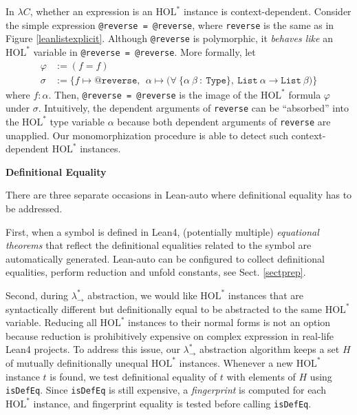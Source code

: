   In $\lambda C$, whether an expression is an $\text{HOL}^*$ instance is context-dependent.
Consider the simple expression \texttt{@reverse = @reverse}, where \texttt{reverse}
is the same as in Figure \ref{leanlistexplicit}. Although \texttt{@reverse} is polymorphic,
it \textit{behaves like} an $\text{HOL}^*$ variable in \texttt{@reverse = @reverse}. More formally,
let
$$\begin{aligned}
\varphi &:= (f = f) \\
\sigma  &:= \{f \mapsto \texttt{@reverse}, \ \ \alpha \mapsto \texttt{(} \forall \ \texttt{\{}\alpha \ \beta \ : \ \texttt{Type\}}, \ 
  \texttt{List} \ \alpha \to \texttt{List} \ \beta \texttt{)}\}
\end{aligned}$$
where $f : \alpha$. Then, \texttt{@reverse = @reverse} is the image of the $\text{HOL}^*$ formula $\varphi$
under $\sigma$. Intuitively, the dependent arguments of \texttt{reverse} can be ``absorbed''
into the $\text{HOL}^*$ type variable $\alpha$ because both dependent arguments of \texttt{reverse} are unapplied.
Our monomorphization procedure is able to detect such context-dependent $\text{HOL}^*$ instances.

\noindent \textbf{Definitional Equality}

  There are three separate occasions in Lean-auto where definitional
equality has to be addressed.

  First, when a symbol is defined in Lean4, (potentially multiple) \textit{equational theorems} that
reflect the definitional equalities related to the symbol are automatically generated.
Lean-auto can be configured to collect definitional equalities, perform reduction and
unfold constants, see Sect. \ref{sectprep}.

  Second, during $\lambda_\to^*$ abstraction, we would like $\text{HOL}^*$ instances
that are syntactically different but definitionally equal to be abstracted to the
same $\text{HOL}^*$ variable. Reducing all $\text{HOL}^*$ instances to their normal forms is
not an option because reduction is prohibitively expensive on complex
expression in real-life Lean4 projects. To address this issue, our $\lambda_\to^*$ abstraction algorithm keeps a
set $H$ of mutually definitionally unequal $\text{HOL}^*$ instances. Whenever a new $\text{HOL}^*$
instance $t$ is found, we test definitional equality of $t$ with elements of $H$
using \texttt{isDefEq}. Since \texttt{isDefEq} is still expensive,
a \textit{fingerprint} is computed for each $\text{HOL}^*$ instance, and fingerprint equality
is tested before calling \texttt{isDefEq}.


